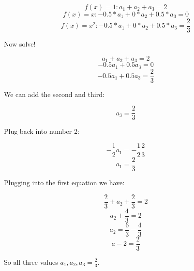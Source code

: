 \documentclass[]{article}
\begin{document}
\[f(x) = 1 : a_1 + a_2 + a_3 = 2\]
\[f(x) = x: -0.5*a_1 + 0*a_2 + 0.5*a_3 = 0\]
\[f(x) = x^2: -0.5*a_1 + 0*a_2 + 0.5*a_3 = \frac23\]

Now solve!

\[a_1 + a_2 + a_3= 2\] \[-0.5a_1 + 0.5a_3 = 0\]
\[-0.5a_1+0.5a_3 = \frac23\]

We can add the second and third:

\[a_3 = \frac23\]

Plug back into number 2:

\[-\frac12a_1 = -\frac12\frac23\] \[a_1 = \frac23\]

Plugging into the first equation we have:

\[\frac23 + a_2 + \frac23 = 2\] \[a_2 + \frac43 = 2\]
\[a_2 = \frac63 - \frac43\] \[a-2 = \frac23\]

So all three values \(a_1, a_2, a_3 = \frac23\).
\end{document}

